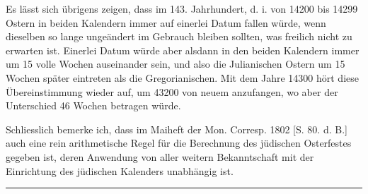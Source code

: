 Es lässt sich übrigens zeigen, dass im 143. Jahrhundert, d. i. von 14200
bis 14299 Ostern in beiden Kalendern immer auf einerlei Datum fallen würde,
wenn dieselben so lange ungeändert im Gebrauch bleiben sollten, was freilich
nicht zu erwarten ist. Einerlei Datum würde aber alsdann in den beiden Kalendern
immer um 15 volle Wochen auseinander sein, und also die Julianischen
Ostern um 15 Wochen später eintreten als die Gregorianischen. Mit dem Jahre
14300 hört diese Übereinstimmung wieder auf, um 43200 von neuem anzufangen,
wo aber der Unterschied 46 Wochen betragen würde.

Schliesslich bemerke ich, dass im Maiheft der Mon. Corresp. 1802 [S. 80.
d. B.] auch eine rein arithmetische Regel für die Berechnung des jüdischen Osterfestes
gegeben ist, deren Anwendung von aller weitern Bekanntschaft mit der
Einrichtung des jüdischen Kalenders unabhängig ist.

\begin{center}\rule{.25\linewidth}{.3pt}\end{center}
\clearpage
\endgroup
